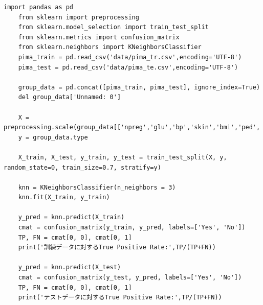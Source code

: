 \documentclass[12pt]{jarticle}
\begin{document}
\begin{lstlisting}[style = py,caption=授業内課題(2)]
    import pandas as pd
    from sklearn import preprocessing
    from sklearn.model_selection import train_test_split
    from sklearn.metrics import confusion_matrix
    from sklearn.neighbors import KNeighborsClassifier
    pima_train = pd.read_csv('data/pima_tr.csv',encoding='UTF-8')
    pima_test = pd.read_csv('data/pima_te.csv',encoding='UTF-8')
    
    group_data = pd.concat([pima_train, pima_test], ignore_index=True)
    del group_data['Unnamed: 0']
    
    X = preprocessing.scale(group_data[['npreg','glu','bp','skin','bmi','ped','age']])
    y = group_data.type
    
    X_train, X_test, y_train, y_test = train_test_split(X, y, random_state=0, train_size=0.7, stratify=y)
    
    knn = KNeighborsClassifier(n_neighbors = 3)
    knn.fit(X_train, y_train)
    
    y_pred = knn.predict(X_train)
    cmat = confusion_matrix(y_train, y_pred, labels=['Yes', 'No'])
    TP, FN = cmat[0, 0], cmat[0, 1]
    print('訓練データに対するTrue Positive Rate:',TP/(TP+FN))
    
    y_pred = knn.predict(X_test)
    cmat = confusion_matrix(y_test, y_pred, labels=['Yes', 'No'])
    TP, FN = cmat[0, 0], cmat[0, 1]
    print('テストデータに対するTrue Positive Rate:',TP/(TP+FN))
\end{lstlisting}
\end{document}
